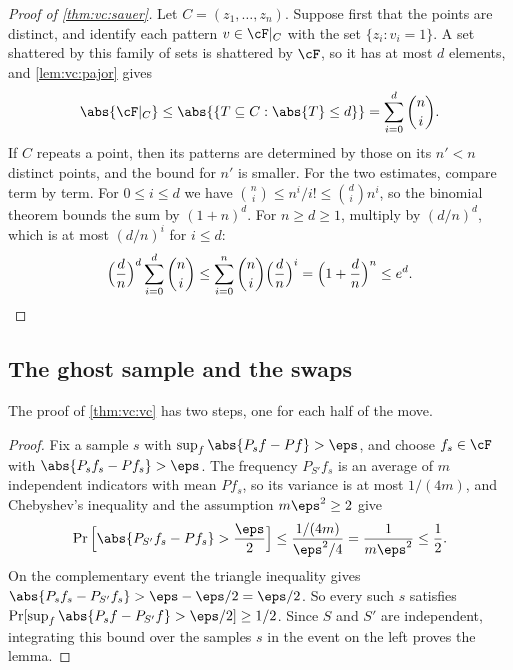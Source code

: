 \begin{refsection}
\begin{proof}[Proof of \cref{thm:vc:sauer}]
Let $C = (z_1,\dots,z_n)$. Suppose first that the points are distinct, and identify each pattern $v\in\cF|_C$ with the set $\{z_i: v_i = 1\}$. A set shattered by this family of sets is shattered by $\cF$, so it has at most $d$ elements, and \cref{lem:vc:pajor} gives
\[
  \abs{\cF|_C}\le\abs{\{T\subseteq C: \abs{T}\le d\}} = \sum_{i=0}^d\binom ni .
\]
If $C$ repeats a point, then its patterns are determined by those on its $n'<n$ distinct points, and the bound for $n'$ is smaller. For the two estimates, compare term by term. For $0\le i\le d$ we have $\binom ni\le n^i/i!\le\binom di n^i$, so the binomial theorem bounds the sum by $(1+n)^d$. For $n\ge d\ge1$, multiply by $(d/n)^d$, which is at most $(d/n)^i$ for $i\le d$:
\[
  \Big(\frac dn\Big)^d\sum_{i=0}^d\binom ni\le\sum_{i=0}^n\binom ni\Big(\frac dn\Big)^i = \Big(1+\frac dn\Big)^n\le e^d . \qedhere
\]
\end{proof}


\subsection{The ghost sample and the swaps}\label{sec:vc:ghost}

The proof of \cref{thm:vc:vc} has two steps, one for each half of the move.


\begin{proof}
Fix a sample $s$ with $\sup_f\abs{P_sf-Pf}>\eps$, and choose $f_s\in\cF$ with $\abs{P_sf_s-Pf_s}>\eps$. The frequency $P_{S'}f_s$ is an average of $m$ independent indicators with mean $Pf_s$, so its variance is at most $1/(4m)$, and Chebyshev's inequality and the assumption $m\eps^2\ge2$ give
\[
  \Pr\Big[\abs{P_{S'}f_s-Pf_s}>\frac\eps2\Big]\le\frac{1/(4m)}{\eps^2/4} = \frac1{m\eps^2}\le\frac12 .
\]
On the complementary event the triangle inequality gives $\abs{P_sf_s-P_{S'}f_s}>\eps-\eps/2 = \eps/2$. So every such $s$ satisfies $\Pr[\sup_f\abs{P_sf-P_{S'}f}>\eps/2]\ge1/2$. Since $S$ and $S'$ are independent, integrating this bound over the samples $s$ in the event on the left proves the lemma.
\end{proof}


\end{refsection}
